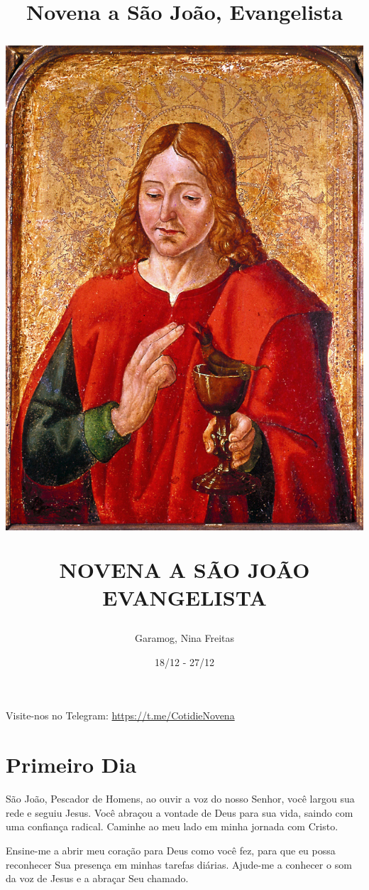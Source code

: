 \documentclass[11pt]{article}
\title{Novena a São João, Evangelista}
\title{
  \includegraphics[scale=0.50]{./assets/imagem.jpg}
  \par
   NOVENA A SÃO JOÃO EVANGELISTA}
\author{Garamog, Nina Freitas}
\date{18/12 - 27/12}
\begin{document}
\maketitle
\thispagestyle{empty}

\pagestyle{fancy}
\fancyhf{} %
\fancyfoot[R]{\thepage}
  
\newpage

\tableofcontents

\centering
\vfill
Visite-nos no Telegram: \url{https://t.me/CotidieNovena}
\newpage

\section{Primeiro Dia}

São João, Pescador de Homens, ao ouvir a voz do nosso Senhor, você largou sua rede e seguiu Jesus. Você abraçou a vontade de Deus para sua vida, saindo com uma confiança radical. Caminhe ao meu lado em minha jornada com Cristo.

Ensine-me a abrir meu coração para Deus como você fez, para que eu possa reconhecer Sua presença em minhas tarefas diárias. Ajude-me a conhecer o som da voz de Jesus e a abraçar Seu chamado.
\end{document}
